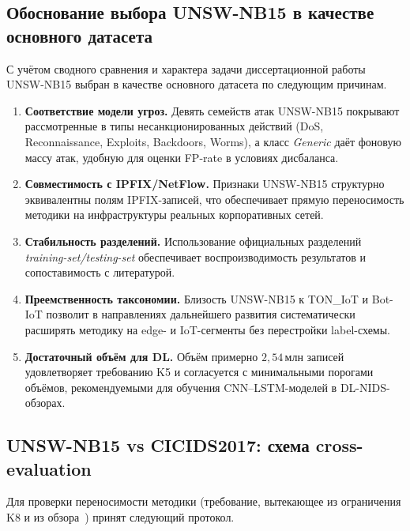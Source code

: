 \subsection{Обоснование выбора UNSW-NB15 в качестве основного датасета}
\label{subsec:unsw-justification}

С учётом сводного сравнения и характера задачи диссертационной работы UNSW-NB15
выбран в качестве основного датасета по следующим причинам.

\begin{enumerate}
    \item \textbf{Соответствие модели угроз.} Девять семейств атак UNSW-NB15
    покрывают рассмотренные в  типы
    несанкционированных действий (DoS, Reconnaissance, Exploits, Backdoors,
    Worms), а класс \emph{Generic} даёт фоновую массу атак, удобную для
    оценки FP-rate в условиях дисбаланса.
    \item \textbf{Совместимость с IPFIX/NetFlow.} Признаки UNSW-NB15
    структурно эквивалентны полям IPFIX-записей, что обеспечивает прямую
    переносимость методики на инфраструктуры реальных корпоративных сетей.
    \item \textbf{Стабильность разделений.} Использование официальных
    разделений \emph{training-set/testing-set} обеспечивает воспроизводимость
    результатов и сопоставимость с литературой.
    \item \textbf{Преемственность таксономии.} Близость UNSW-NB15 к TON\_IoT и
    Bot-IoT позволит в направлениях дальнейшего развития систематически
    расширять методику на edge- и IoT-сегменты без перестройки label-схемы.
    \item \textbf{Достаточный объём для DL.} Объём примерно \(2{,}54\,\text{млн}\)
    записей удовлетворяет требованию K5 и согласуется с минимальными порогами
    объёмов, рекомендуемыми для обучения CNN--LSTM-моделей в DL-NIDS-обзорах.
\end{enumerate}

\subsection{UNSW-NB15 vs CICIDS2017: схема cross-evaluation}
\label{subsec:unsw-vs-cic}

Для проверки переносимости методики (требование, вытекающее из ограничения
K8 и из обзора~\cite{pendlebury2019tesseract}) принят следующий протокол.

